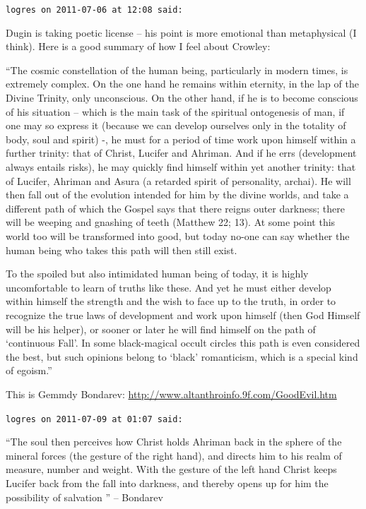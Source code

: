 \begin{footnotesize}
\begin{sffamily}
\hfill

\texttt{logres on 2011-07-06 at 12:08 said:}

Dugin is taking poetic license -- his point is more emotional than metaphysical (I think). Here is a good summary of how I feel about Crowley:

``The cosmic constellation of the human being, particularly in modern times, is extremely complex. On the one hand he remains within eternity, in the lap of the Divine Trinity, only unconscious. On the other hand, if he is to become conscious of his situation -- which is the main task of the spiritual ontogenesis of man, if one may so express it (because we can develop ourselves only in the totality of body, soul and spirit) -, he must for a period of time work upon himself within a further trinity: that of Christ, Lucifer and Ahriman. And if he errs (development always entails risks), he may quickly find himself within yet another trinity: that of Lucifer, Ahriman and Asura (a retarded spirit of personality, archai). He will then fall out of the evolution intended for him by the divine worlds, and take a different path of which the Gospel says that there reigns outer darkness; there will be weeping and gnashing of teeth (Matthew 22; 13). At some point this world too will be transformed into good, but today no-one can say whether the human being who takes this path will then still exist.

To the spoiled but also intimidated human being of today, it is highly uncomfortable to learn of truths like these. And yet he must either develop within himself the strength and the wish to face up to the truth, in order to recognize the true laws of development and work upon himself (then God Himself will be his helper), or sooner or later he will find himself on the path of `continuous Fall'. In some black-magical occult circles this path is even considered the best, but such opinions belong to `black' romanticism, which is a special kind of egoism.''

This is Gemmdy Bondarev:
\url{http://www.altanthroinfo.9f.com/GoodEvil.htm}


\hfill

\texttt{logres on 2011-07-09 at 01:07 said:}

``The soul then perceives how Christ holds Ahriman back in the sphere of the mineral forces (the gesture of the right hand), and directs him to his realm of measure, number and weight. With the gesture of the left hand Christ keeps Lucifer back from the fall into darkness, and thereby opens up for him the possibility of salvation '' -- Bondarev


\end{sffamily}
\end{footnotesize}
